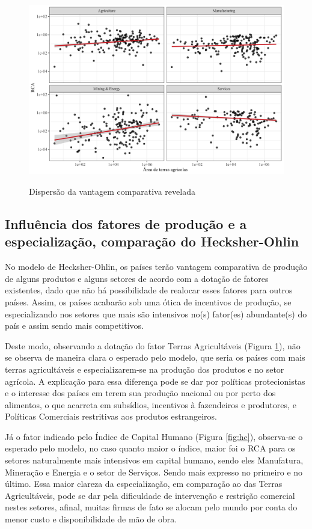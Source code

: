 \begin{figure}[!h]
    \centering
    \caption{Dispersão da vantagem comparativa revelada}
    \includegraphics*[width = 0.8\linewidth]{../plots/rca_land.png}
    \label{fig:agro}
\end{figure}

\subsection{Influência dos fatores de produção e a especialização, comparação do Hecksher-Ohlin}

No modelo de Hecksher-Ohlin, os países terão vantagem comparativa de produção de alguns produtos e alguns setores de acordo com a dotação de fatores existentes, dado que não há possibilidade de realocar esses fatores para outros países. Assim, os países acabarão sob uma ótica de incentivos  de produção, se especializando nos setores que mais são intensivos no(s) fator(es) abundante(s) do país e assim sendo mais competitivos.

Deste modo, observando a dotação do fator Terras Agricultáveis (Figura \ref{fig:agro}), não se observa de maneira clara o esperado pelo modelo, que seria os países com mais terras agricultáveis e especializarem-se na produção dos produtos e no setor agrícola. A explicação para essa diferença pode se dar por políticas protecionistas e o interesse dos países em terem sua produção nacional ou por perto dos alimentos, o que acarreta em subsídios, incentivos à fazendeiros e produtores, e Políticas Comerciais restritivas aos produtos estrangeiros.

Já o fator indicado pelo Índice de Capital Humano (Figura \ref{fig:hc}), observa-se o esperado pelo modelo, no caso quanto maior o índice, maior foi o RCA para os setores naturalmente mais intensivos em capital humano, sendo eles Manufatura, Mineração e Energia e o setor de Serviços. Sendo mais expresso no primeiro e no último. Essa maior clareza da especialização, em comparação ao das Terras Agricultáveis, pode se dar pela dificuldade de intervenção e restrição comercial nestes setores, afinal, muitas firmas de fato se alocam pelo mundo por conta do menor custo e disponibilidade de mão de obra.

